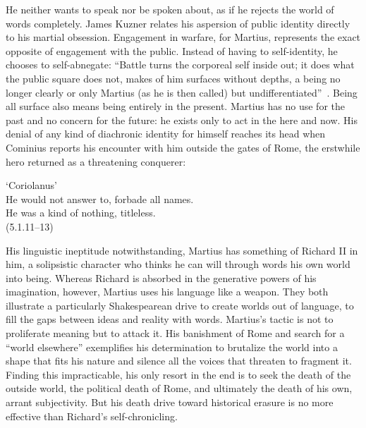 He neither wants to speak nor be spoken about, as if he rejects the world of words completely.
James Kuzner relates his aspersion of public identity directly to his martial obsession.
Engagement in warfare, for Martius, represents the exact opposite of engagement with the public.
Instead of having to self-identity, he chooses to self-abnegate:
``Battle turns the corporeal self inside out; it does what the public square does not, makes of him surfaces without depths, a being no longer clearly or only Martius (as he is then called) but undifferentiated''~\cite[190]{kuzner_unbuilding_2007}.
Being all surface also means being entirely in the present.
Martius has no use for the past and no concern for the future: he exists only to act in the here and now.
His denial of any kind of diachronic identity for himself reaches its head when Cominius reports his encounter with him outside the gates of Rome, the erstwhile hero returned as a threatening conquerer:
\begin{vq}
`Coriolanus'\\
He would not answer to, forbade all names.\\
He was a kind of nothing, titleless.\\
\hfill(5.1.11--13)
\end{vq}
His linguistic ineptitude notwithstanding, Martius has something of Richard II in him, a solipsistic character who thinks he can will through words his own world into being.
Whereas Richard is absorbed in the generative powers of his imagination, however, Martius uses his language like a weapon.
They both illustrate a particularly Shakespearean drive to create worlds out of language, to fill the gaps between ideas and reality with words.
Martius's tactic is not to proliferate meaning but to attack it.
His banishment of Rome and search for a ``world elsewhere'' exemplifies his determination to brutalize the world into a shape that fits his nature and silence all the voices that threaten to fragment it.
Finding this impracticable, his only resort in the end is to seek the death of the outside world, the political death of Rome, and ultimately the death of his own, arrant subjectivity.
But his death drive toward historical erasure is no more effective than Richard's self-chronicling.

